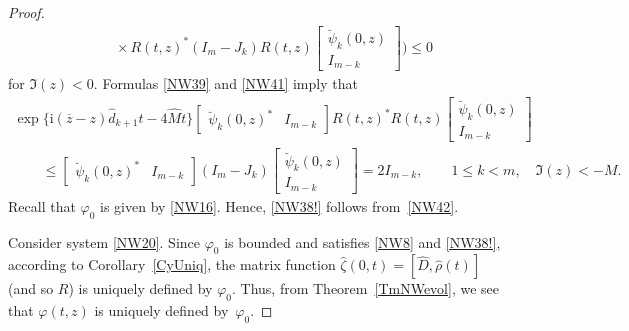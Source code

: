 \documentclass[pdftex]{sigma}
\def\vp{\varphi}
\def\wh{\widehat}
\def\ov{\overline}
\newcommand{\I}{\mathrm{i}}
\numberwithin{equation}{section}
\begin{document}
\begin{proof}
\begin{gather}
\qquad{}\times R(t,z)^* (I_m-J_k )
R(t,z)\begin{bmatrix}\breve \psi_k(0,z) \\ I_{m-k} \end{bmatrix} \bigg)
\leq 0\label{NW41}
\end{gather}
for $\Im(z)<0$. Formulas \eqref{NW39} and \eqref{NW41} imply that
\begin{gather} \label{NW42}
\exp\big\{\I(\ov z -z)\wh d_{k+1} t - 4 \wh M t\big\}
\begin{bmatrix} \breve \psi_k( 0,z)^* & I_{m-k} \end{bmatrix} R(t,z)^*
R(t,z)\begin{bmatrix}\breve \psi_k(0,z) \\ I_{m-k} \end{bmatrix}
\\ \qquad{}
\leq
\begin{bmatrix} \breve \psi_k( 0,z)^* & I_{m-k} \end{bmatrix} (I_m-J_k )
\begin{bmatrix}\breve \psi_k(0,z) \\ I_{m-k} \end{bmatrix}
=2 I_{m-k}, \qquad 1\leq k<m, \quad \Im(z)<-M.\nonumber
\end{gather}
Recall that $\vp_0$ is given by \eqref{NW16}. Hence, \eqref{NW38!} follows from~\eqref{NW42}.

Consider system \eqref{NW20}. Since $\vp_0$ is bounded and satisf\/ies \eqref{NW8} and \eqref{NW38!}, according to Corollary~\ref{CyUniq},
the matrix function
$\wh \zeta(0,t)=[\wh D,\wh \rho(t)]$ (and so $R$) is uniquely def\/ined by $\vp_0$. Thus, from Theorem~\ref{TmNWevol}, we see that
$\vp(t,z)$ is uniquely def\/ined by~$\vp_0$.


\end{proof}
\end{document}
